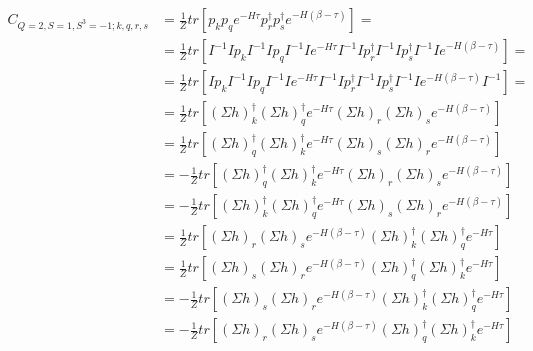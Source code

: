 \begin{equation*}
  \begin{aligned}
    C_{Q=2,S=1,S^3=-1;k,q,r,s} &= \frac{1}{Z}tr\left[p_kp_qe^{-H\tau}p^\dagger_rp^\dagger_se^{-H\left(\beta-\tau\right)}\right] = 
    \\
    &= \frac{1}{Z}tr\left[I^{-1}Ip_kI^{-1}Ip_qI^{-1}Ie^{-H\tau}I^{-1}Ip^\dagger_rI^{-1}Ip^\dagger_sI^{-1}Ie^{-H\left(\beta-\tau\right)}\right] = \\
    &= \frac{1}{Z}tr\left[Ip_kI^{-1}Ip_qI^{-1}Ie^{-H\tau}I^{-1}Ip^\dagger_rI^{-1}Ip^\dagger_sI^{-1}Ie^{-H\left(\beta-\tau\right)}I^{-1}\right] = 
    \\
    &= \frac{1}{Z}tr\left[(\Sigma h)^\dagger_k(\Sigma h)^\dagger_qe^{-H\tau}(\Sigma h)_r(\Sigma h)_se^{-H\left(\beta-\tau\right)}\right] 
    \\
    &= \frac{1}{Z}tr\left[(\Sigma h)^\dagger_q(\Sigma h)^\dagger_ke^{-H\tau}(\Sigma h)_s(\Sigma h)_re^{-H\left(\beta-\tau\right)}\right] 
    \\
    &= - \frac{1}{Z}tr\left[(\Sigma h)^\dagger_q(\Sigma h)^\dagger_ke^{-H\tau}(\Sigma h)_r(\Sigma h)_se^{-H\left(\beta-\tau\right)}\right]
    \\
    &= - \frac{1}{Z}tr\left[(\Sigma h)^\dagger_k(\Sigma h)^\dagger_qe^{-H\tau}(\Sigma h)_s(\Sigma h)_re^{-H\left(\beta-\tau\right)}\right] 
    \\
    &= \frac{1}{Z}tr\left[(\Sigma h)_r(\Sigma h)_se^{-H\left(\beta-\tau\right)}(\Sigma h)^\dagger_k(\Sigma h)^\dagger_qe^{-H\tau}\right] 
    \\
    &= \frac{1}{Z}tr\left[(\Sigma h)_s(\Sigma h)_re^{-H\left(\beta-\tau\right)}(\Sigma h)^\dagger_q(\Sigma h)^\dagger_ke^{-H\tau}\right] 
    \\
    &= - \frac{1}{Z}tr\left[(\Sigma h)_s(\Sigma h)_re^{-H\left(\beta-\tau\right)}(\Sigma h)^\dagger_k(\Sigma h)^\dagger_qe^{-H\tau}\right] 
    \\
    &= - \frac{1}{Z}tr\left[(\Sigma h)_r(\Sigma h)_se^{-H\left(\beta-\tau\right)}(\Sigma h)^\dagger_q(\Sigma h)^\dagger_ke^{-H\tau}\right] 
    \\
  \end{aligned}
\end{equation*}

